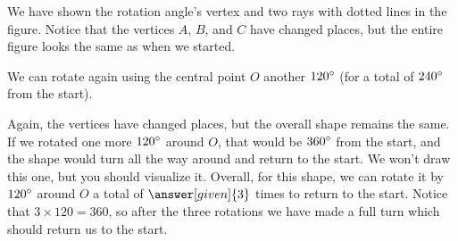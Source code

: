 \documentclass{ximera}
\begin{document}
\begin{example}
\begin{image}
\end{image}
We have shown the rotation angle's vertex and two rays with dotted lines in the figure. Notice that the vertices $A$, $B$, and $C$ have changed places, but the entire figure looks the same as when we started.

We can rotate again using the central point $O$ another $120\degree$ (for a total of $240\degree$ from the start).
\begin{image}
\end{image}
Again, the vertices have changed places, but the overall shape remains the same. If we rotated one more $120\degree$ around $O$, that 
would be $360\degree$ from the start, and the shape would turn all the way around and return to the start. We won't draw this one, 
but you should visualize it. Overall, for this shape, we can rotate it by $120\degree$ around $O$ a total of $\answer[given]{3}$ times to return to the start. Notice that $3 \times 120 = 360$, so after the three rotations we have made a full turn which should return us to the start.

\end{example}
\end{document}
